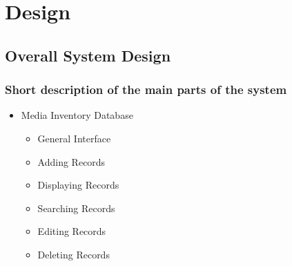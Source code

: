 \chapter{Design}

\section{Overall System Design}

\subsection{Short description of the main parts of the system}

\begin{itemize}
    \item Media Inventory Database
    \begin{itemize}
        \item General Interface
        \item Adding Records
        \item Displaying Records
        \item Searching Records
        \item Editing Records
        \item Deleting Records
    \end{itemize}
\end{itemize}

